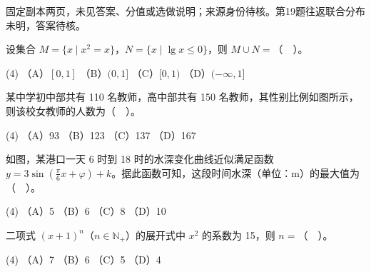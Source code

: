 

\begin{gktip}
固定副本两页，未见答案、分值或选做说明；来源身份待核。第19题往返联合分布未明，答案待核。
\end{gktip}


\begin{question}

设集合 $M=\{x\mid x^2=x\}$，$N=\{x\mid\lg x\leq0\}$，则 $M\cup N=$（　）。

\begin{gkopts}(4)
\task （A）$[0,1]$
\task （B）$(0,1]$
\task （C）$[0,1)$
\task （D）$(-\infty,1]$
\end{gkopts}

\Needspace{0.4\textheight}
\end{question}
\begin{question}

某中学初中部共有 110 名教师，高中部共有 150 名教师，其性别比例如图所示，则该校女教师的人数为（　）。
\nopagebreak[4]
\begin{center}\end{center}
\nopagebreak[4]
\begin{gkopts}(4)
\task （A）93
\task （B）123
\task （C）137
\task （D）167
\end{gkopts}

\Needspace{0.4\textheight}
\end{question}
\begin{question}

如图，某港口一天 6 时到 18 时的水深变化曲线近似满足函数 $y=3\sin(\frac\pi6x+\varphi)+k$。据此函数可知，这段时间水深（单位：m）的最大值为（　）。
\nopagebreak[4]
\begin{center}\end{center}
\nopagebreak[4]
\begin{gkopts}(4)
\task （A）5
\task （B）6
\task （C）8
\task （D）10
\end{gkopts}

\end{question}
\begin{question}

二项式 $(x+1)^n$（$n\in\mathbb N_+$）的展开式中 $x^2$ 的系数为 15，则 $n=$（　）。

\begin{gkopts}(4)
\task （A）7
\task （B）6
\task （C）5
\task （D）4
\end{gkopts}

\Needspace{0.4\textheight}
\end{question}
